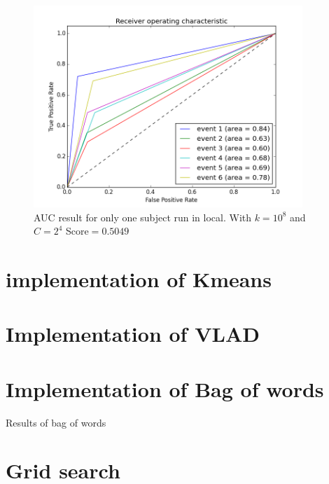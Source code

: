 \documentclass[]{article}
\begin{document}
\begin{center}
\begin{figure}\caption{AUC result for only one subject run in local. With $k=10^8$ and $C=2^{4}$ Score$=0.5049$}
\includegraphics[height=3.0in]{plots/oneSubjectAUCC16.png}
\end{figure}
\end{center}





\section{implementation of Kmeans}

\section{Implementation of VLAD}

\section{Implementation of Bag of words}
Results of bag of words

\section{Grid search}
\end{document}
